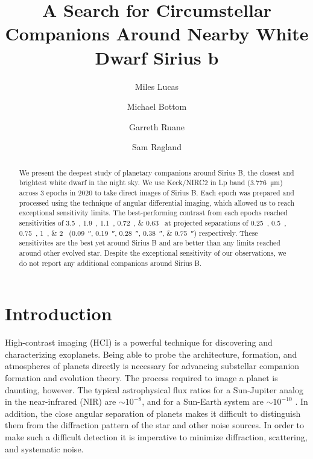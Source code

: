 \documentclass[twocolumn]{aastex631}
\begin{document}
\title{A Search for Circumstellar Companions Around Nearby White Dwarf Sirius b}



\author[0000-0001-6341-310X]{Miles Lucas}

\author[0000-0003-1341-5531]{Michael Bottom}

\author[0000-0003-4769-1665]{Garreth Ruane}

\author[0000-0002-0696-1780]{Sam Ragland}


\begin{abstract}

We present the deepest study of planetary companions around Sirius B, the closest and brightest white dwarf in the night sky. We use Keck/NIRC2 in Lp band (\qty{3.776}{\micro\meter}) across 3 epochs in 2020 to take direct images of Sirius B. Each epoch was prepared and processed using the technique of angular differential imaging, which allowed us to reach exceptional sensitivity limits. The best-performing contrast from each epochs reached sensitivities of \qtylist{3.5;1.9;1.1;0.72;0.63}{\mj} at projected separations of \qtylist{0.25;0.5;0.75;1;2}{\au} (\qtylist{0.09;0.19;0.28;0.38;0.75}{\arcsecond}) respectively. These sensitivites are the best yet around Sirius B and are better than any limits reached around other evolved star. Despite the exceptional sensitivity of our observations, we do not report any additional companions around Sirius B.

\end{abstract}

\section{Introduction} \label{sec:intro}

High-contrast imaging (HCI) is a powerful technique for discovering and characterizing exoplanets. Being able to probe the architecture, formation, and atmospheres of planets directly is necessary for advancing substellar companion formation and evolution theory. The process required to image a planet is daunting, however. The typical astrophysical flux ratios for a Sun-Jupiter analog in the near-infrared (NIR) are $\sim10^{-8}$, and for a Sun-Earth system are $\sim10^{-10}$ \citep{traub_direct_2010}. In addition, the close angular separation of planets makes it difficult to distinguish them from the diffraction pattern of the star and other noise sources. In order to make such a difficult detection it is imperative to minimize diffraction, scattering, and systematic noise.
\end{document}
